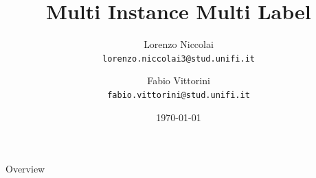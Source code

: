 \documentclass{beamer}
\title[MIML]{Multi Instance Multi Label}
\institute[]{{\large Machine Learning}\\\vspace{0.3cm}\textit{University of Florence, Department of Information Engineering}}
\author[L. Niccolai, F. Vittorini]
{\parbox[c]{1.5in}{Lorenzo Niccolai\\\texttt{\tiny lorenzo.niccolai3@stud.unifi.it}} \and 
	\parbox[c]{1.5in}{Fabio Vittorini\\\texttt{\tiny fabio.vittorini@stud.unifi.it}}}
\date{\today}
\begin{document}
	
	
\frame[plain]{\titlepage} %

\usebackgroundtemplate
{
}



\begin{frame}{Overview}
	\tableofcontents
\end{frame}






	
\end{document}

